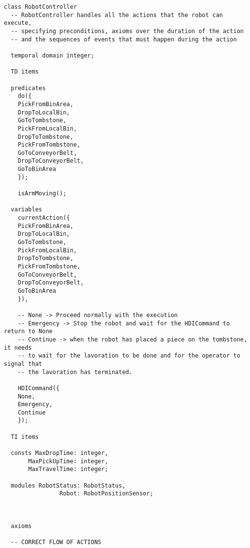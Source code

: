 \begin{lstlisting}[fontadjust, mathescape, frame=single]
class RobotController
  -- RobotController handles all the actions that the robot can execute, 
  -- specifying preconditions, axioms over the duration of the action
  -- and the sequences of events that must happen during the action

  temporal domain integer;

  TD items

  predicates
    do({
    PickFromBinArea,
    DropToLocalBin,
    GoToTombstone,
    PickFromLocalBin,
    DropToTombstone,
    PickFromTombstone,
    GoToConveyorBelt,
    DropToConveyorBelt,
    GoToBinArea
    });

    isArmMoving();

  variables
    currentAction({
    PickFromBinArea,
    DropToLocalBin,
    GoToTombstone,
    PickFromLocalBin,
    DropToTombstone,
    PickFromTombstone,
    GoToConveyorBelt,
    DropToConveyorBelt,
    GoToBinArea
    }),

    -- None -> Proceed normally with the execution
    -- Emergency -> Stop the robot and wait for the HDICommand to return to None
    -- Continue -> when the robot has placed a piece on the tombstone, it needs 
    -- to wait for the lavoration to be done and for the operator to signal that 
    -- the lavoration has terminated.

    HDICommand({
    None,
    Emergency,
    Continue
    });
    
  TI items 
  
  consts MaxDropTime: integer,
       MaxPickUpTime: integer,
       MaxTravelTime: integer;

  modules RobotStatus: RobotStatus,
                Robot: RobotPositionSensor;

  
  
  axioms

  -- CORRECT FLOW OF ACTIONS


\end{lstlisting}
